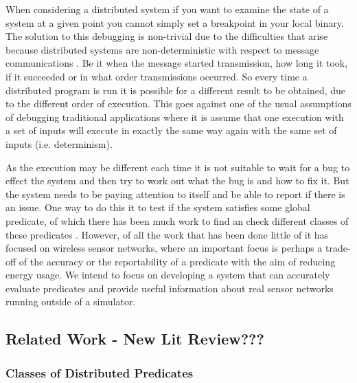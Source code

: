 When considering a distributed system if you want to examine the state of a system at a given point you cannot simply set a breakpoint in your local binary. The solution to this debugging is non-trivial due to the difficulties that arise because distributed systems are non-deterministic with respect to message communications \cite{?}. Be it when the message started transmission, how long it took, if it succeeded or in what order transmissions occurred. So every time a distributed program is run it is possible for a different result to be obtained, due to the different order of execution. This goes against one of the usual assumptions of debugging traditional applications where it is assume that one execution with a set of inputs will execute in exactly the same way again with the same set of inputs \cite{?} (i.e. determinism).

As the execution may be different each time it is not suitable to wait for a bug to effect the system and then try to work out what the bug is and how to fix it. But the system needs to be paying attention to itself and be able to report if there is an issue. One way to do this it to test if the system satisfies some global predicate, of which there has been much work to find an check different classes of these predicates \cite{553309,345831,277788}. However, of all the work that has been done little of it has focused on wireless sensor networks, where an important focus is perhaps a trade-off of the accuracy or the reportability of a predicate with the aim of reducing energy usage. We intend to focus on developing a system that can accurately evaluate predicates and provide useful information about real sensor networks running outside of a simulator.


\subsection{Related Work - New Lit Review???}

\subsubsection*{Classes of Distributed Predicates}

